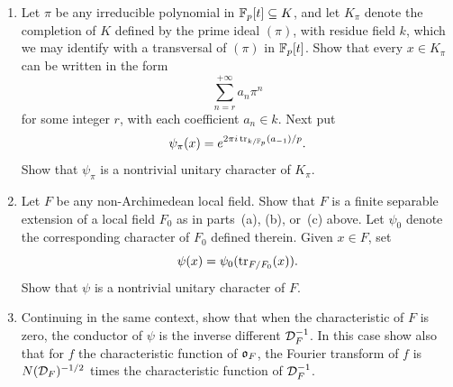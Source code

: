 \begin{exercise}[3]
\begin{enumerate}[label=(\alph*)]
      of conductor $t^{-2}\FF_p\pseries{t^{-1}}$. (\emph{Note}: This differs
      from the book, which puts $\psi_\infty(x) = e^{2\pi i a_1/p}$, of
      conductor $\FF_p\pseries{t^{-1}}$; with that choice part~(d) of
      \cref{ex:ch7-5} fails.)
    \item Let $\pi$ be any irreducible polynomial in $\mathbb{F}_p[t] \subseteq K$,
      and let $K_\pi$ denote the completion of $K$ defined by the prime ideal
      $(\pi)$, with residue field $k$, which we may identify with a
      transversal of $(\pi)$ in $\mathbb{F}_p[t]$. Show that every $x \in K_\pi$ can
      be written in the form
      \[
        \sum_{n=r}^{+\infty} a_n \pi^n
      \]
      for some integer $r$, with each coefficient $a_n \in k$. Next put
      \[
        \psi_\pi(x) = e^{2\pi i \operatorname{tr}_{k/\mathbb{F}_p}(a_{-1})/p}.
      \]
      Show that $\psi_\pi$ is a nontrivial unitary character of $K_\pi$.
    \item Let $F$ be any non-Archimedean local field. Show that $F$ is a
      finite separable extension of a local field $F_0$ as in parts~(a), (b),
      or~(c) above. Let $\psi_0$ denote the corresponding character of $F_0$
      defined therein. Given $x \in F$, set
      \[
        \psi(x) = \psi_0(\operatorname{tr}_{F/F_0}(x)).
      \]
      Show that $\psi$ is a nontrivial unitary character of $F$.
    \item Continuing in the same context, show that when the characteristic
      of $F$ is zero, the conductor of $\psi$ is the inverse different
      $\mathcal{D}_F^{-1}$. In this case show also that for $f$ the characteristic
      function of $\mathfrak{o}_F$, the Fourier transform of $f$ is
      $N(\mathcal{D}_F)^{-1/2}$ times the characteristic function of
      $\mathcal{D}_F^{-1}$.
  \end{enumerate}
\end{exercise}

